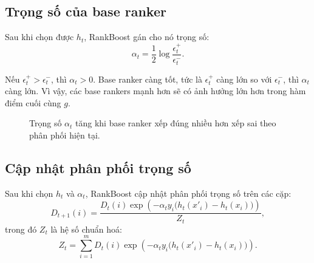 \subsection{Trọng số của base ranker}

Sau khi chọn được \(h_t\), RankBoost gán cho nó trọng số:
\begin{equation}
    \alpha_t
    =
    \frac{1}{2}
    \log
    \frac{\epsilon_t^{+}}{\epsilon_t^{-}}.
    \label{eq:section5-alpha}
\end{equation}

Nếu \(\epsilon_t^{+}>\epsilon_t^{-}\), thì \(\alpha_t>0\). Base ranker càng tốt, tức là \(\epsilon_t^{+}\) càng lớn so với \(\epsilon_t^{-}\), thì \(\alpha_t\) càng lớn. Vì vậy, các base rankers mạnh hơn sẽ có ảnh hưởng lớn hơn trong hàm điểm cuối cùng \(g\).

\begin{figure}[H]
    \centering
    \caption{Trọng số \(\alpha_t\) tăng khi base ranker xếp đúng nhiều hơn xếp sai theo phân phối hiện tại.}
    \label{fig:section5-alpha-ratio}
\end{figure}

\subsection{Cập nhật phân phối trọng số}

Sau khi chọn \(h_t\) và \(\alpha_t\), RankBoost cập nhật phân phối trọng số trên các cặp:
\begin{equation}
    D_{t+1}(i)
    =
    \frac{
        D_t(i)
        \exp
        \left(
            -\alpha_t
            y_i
            \big(h_t(x'_i)-h_t(x_i)\big)
        \right)
    }{
        Z_t
    },
    \label{eq:section5-distribution-update}
\end{equation}
trong đó \(Z_t\) là hệ số chuẩn hoá:
\begin{equation}
    Z_t
    =
    \sum_{i=1}^{m}
    D_t(i)
    \exp
    \left(
        -\alpha_t
        y_i
        \big(h_t(x'_i)-h_t(x_i)\big)
    \right).
    \label{eq:section5-normalization-factor}
\end{equation}

